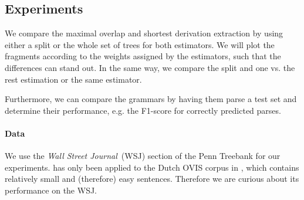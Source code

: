 \subsection{Experiments}





We compare the maximal overlap and shortest derivation extraction by using either a split or the whole set of trees for both estimators. We will plot the fragments according to the weights assigned by the estimators, such that the differences can stand out. In the same way, we compare the split and one vs. the rest estimation or the same estimator.

Furthermore, we can compare the grammars by having them parse a test set and determine their performance, e.g. the F1-score for correctly predicted parses.

\paragraph{Data}
We use the \emph{Wall Street Journal}~(WSJ) section of the Penn Treebank for our experiments. \dops{} has only been applied to the Dutch OVIS corpus in \cite{zollmann2005}, which contains relatively small and (therefore) easy sentences. Therefore we are curious about its performance on the WSJ.

